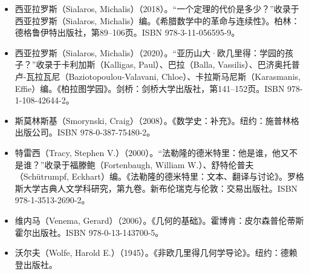 \begin{itemize}
\item 西亚拉罗斯（Sialaros, Michalis）（2018）。“一个定理的代价是多少？”收录于西亚拉罗斯（Sialaros, Michalis）编。《希腊数学中的革命与连续性》。柏林：德格鲁伊特出版社，第89–106页。ISBN 978-3-11-056595-9。  
\item 西亚拉罗斯（Sialaros, Michalis）（2020）。“亚历山大·欧几里得：学园的孩子？”收录于卡利加斯（Kalligas, Paul）、巴拉（Balla, Vassilis）、巴济奥托普卢-瓦拉瓦尼（Baziotopoulou-Valavani, Chloe）、卡拉斯马尼斯（Karasmanis, Effie）编。《柏拉图学园》。剑桥：剑桥大学出版社，第141–152页。ISBN 978-1-108-42644-2。  
\item 斯莫林斯基（Smorynski, Craig）（2008）。《数学史：补充》。纽约：施普林格出版公司。ISBN 978-0-387-75480-2。
\item 特雷西（Tracy, Stephen V.）（2000）。“法勒隆的德米特里：他是谁，他又不是谁？”收录于福滕鲍（Fortenbaugh, William W.）、舒特伦普夫（Schütrumpf, Eckhart）编。《法勒隆的德米特里：文本、翻译与讨论》。罗格斯大学古典人文学科研究，第九卷。新布伦瑞克与伦敦：交易出版社。ISBN 978-1-3513-2690-2。  
\item 维内马（Venema, Gerard）（2006）。《几何的基础》。霍博肯：皮尔森普伦蒂斯霍尔出版社。ISBN 978-0-13-143700-5。  
\item 沃尔夫（Wolfe, Harold E.）（1945）。《非欧几里得几何学导论》。纽约：德赖登出版社。
\end{itemize}